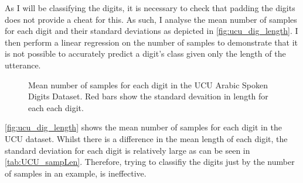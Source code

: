 As I will be classifying the digits, it is necessary to check that padding the digits does not provide a cheat for this. As such, I analyse the mean number of samples for each digit and their standard deviations as depicted in \autoref{fig:ucu_dig_length}. I then perform a linear regression on the number of samples to demonstrate that it is not possible to accurately predict a digit's class given only the length of the utterance.

\begin{figure}
\centering
{}

	\caption{Mean number of samples for each digit in the UCU Arabic Spoken Digits Dataset. Red bars show the standard devaition in length for each each digit.}
	\label{fig:ucu_dig_length}

\end{figure}

\autoref{fig:ucu_dig_length} shows the mean number of samples for each digit in the UCU dataset. Whilst there is a difference in the mean length of each digit, the standard deviation for each digit is relatively large as can be seen in \autoref{tab:UCU_sampLen}. Therefore, trying to classifiy the digits just by the number of samples in an example, is ineffective.

